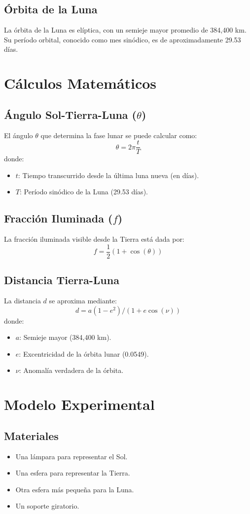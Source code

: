 \documentclass[12pt]{article}
\begin{document}
\subsection{Órbita de la Luna}
La órbita de la Luna es elíptica, con un semieje mayor promedio de 384,400 km. Su período orbital, conocido como mes sinódico, es de aproximadamente 29.53 días.

\section{Cálculos Matemáticos}
\subsection{Ángulo Sol-Tierra-Luna (\( \theta \))}
El ángulo \( \theta \) que determina la fase lunar se puede calcular como:
\[
\theta = 2\pi \frac{t}{T}
\]
donde:
\begin{itemize}
    \item \( t \): Tiempo transcurrido desde la última luna nueva (en días).
    \item \( T \): Período sinódico de la Luna (29.53 días).
\end{itemize}

\subsection{Fracción Iluminada (\( f \))}
La fracción iluminada visible desde la Tierra está dada por:
\[
 f = \frac{1}{2} \left( 1 + \cos(\theta) \right)
\]
\subsection{Distancia Tierra-Luna}
La distancia \( d \) se aproxima mediante:
\[
d = a (1 - e^2) / (1 + e \cos(\nu))
\]
donde:
\begin{itemize}
    \item \( a \): Semieje mayor (384,400 km).
    \item \( e \): Excentricidad de la órbita lunar (0.0549).
    \item \( \nu \): Anomalía verdadera de la órbita.
\end{itemize}

\section{Modelo Experimental}
\subsection{Materiales}
\begin{itemize}
    \item Una lámpara para representar el Sol.
    \item Una esfera para representar la Tierra.
    \item Otra esfera más pequeña para la Luna.
    \item Un soporte giratorio.
\end{itemize}
\end{document}
